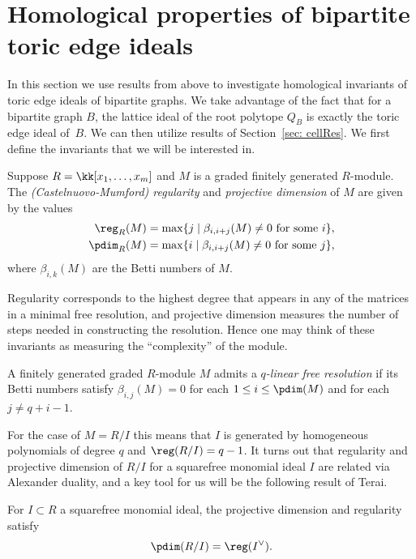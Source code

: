\section{Homological properties of bipartite toric edge ideals} \label{sec: edge+ideal+results}

In this section we use results from above to investigate homological invariants of toric edge ideals of bipartite graphs.  We take advantage of the fact that for a bipartite graph $B$, the lattice ideal of the root polytope $Q_B$ is exactly the toric edge ideal of~$B$. We can then  utilize results of Section~\ref{sec: cellRes}. We first define the invariants that we will be interested in.

\begin{definition}\label{def: regularity} Suppose $R = \kk[x_1, \dots, x_m]$ and $M$ is a graded finitely generated $R$-module. The \textit{(Castelnuovo-Mumford) regularity} and \textit{projective dimension} of $M$ are given by the values
\begin{align*}
\reg_R(M) &= \max\{j \mid \beta_{i,i+j}(M) \neq 0 \text{ for some } i\}, \\
\pdim_R(M) &= \max\{i \mid \beta_{i,i+j}(M)\neq 0 \text{ for some } j\},
\end{align*}
where $\beta_{i,k}(M)$ are the Betti numbers of $M$.
\end{definition}

Regularity corresponds to the highest degree that appears in any of the matrices in a minimal free resolution, and projective dimension measures the number of steps needed in constructing the resolution. Hence one may think of these invariants as measuring the ``complexity'' of the module.


\begin{definition}\label{def: linearRes} A finitely generated graded $R$-module $M$ admits a \textit{$q$-linear free resolution} if its Betti numbers satisfy $\beta_{i,j}(M) = 0$ for each $1 \leq i \leq \pdim(M)$ and for each $j \neq q + i -1$.
\end{definition}

For the case of $M = R/I$ this means that $I$ is generated by homogeneous polynomials of degree $q$ and $\reg(R/I) = q-1$.  
It turns out that regularity and projective dimension of $R/I$ for a squarefree monomial ideal $I$ are related via Alexander duality, and a key tool for us will be the following result of Terai.


\begin{theorem}\cite[Theorem 0.2]{terai1997generalization}\label{thm: projreg}
For $I \subset R$ a squarefree monomial ideal, the projective dimension and regularity satisfy
\[\pdim(R/I) = \reg(I^\vee).\]
\end{theorem}

